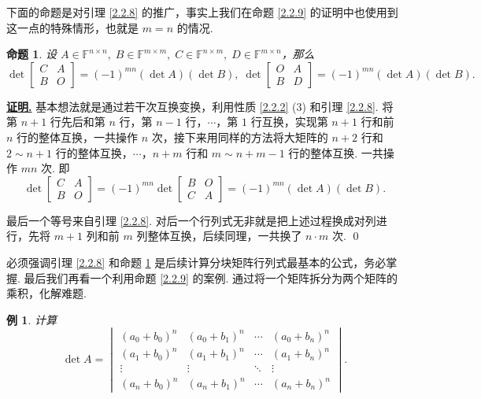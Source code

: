 \documentclass[10pt,openany]{article}
\theoremstyle{thmstyle} %
\theoremstyle{defstyle} %
\theoremstyle{prostyle} %
\newtheorem{proposition}[theorem]{命题}
\theoremstyle{exastyle}
\newtheorem{example}[theorem]{例}
\theoremstyle{remstyle}
\renewenvironment{proof}[1][证明]{\par\underline{\textbf{#1.}} \;\fangsong}{\qed\par}
\newcommand{\F}{\mathbb{F}}
\newcommand{\n}{^{n \times n}}
\newcommand{\mn}{^{m \times n}}
\newcommand{\nm}{^{n \times m}}
\begin{document}
下面的命题是对引理 \ref{2.2.8} 的推广，事实上我们在命题 \ref{2.2.9} 的证明中也使用到这一点的特殊情形，也就是 \( m=n \) 的情况. 

\begin{proposition} \label{2.2.25}
    设 \( A \in \F\n, \; B \in \F^{m \times m}, \; C \in \F\nm, \; D \in \F\mn \)，那么
    \[ 
    \det\begin{bmatrix} 
    	C & A \\
    	 B & O 
    	\end{bmatrix}= (-1)^{mn} (\det A)(\det B), \; 
    \det\begin{bmatrix} 
    	O & A \\
    	 B & D
    \end{bmatrix}= (-1)^{mn} (\det A)(\det B). \]
    
\end{proposition}

\begin{proof}
	基本想法就是通过若干次互换变换，利用性质 \ref{2.2.2} (3) 和引理 \ref{2.2.8}. 将第 \( n+1 \) 行先后和第 \( n \) 行，第 \( n-1 \) 行，\( \cdots \)，第 \( 1 \) 行互换，实现第 \( n+1 \) 行和前 \( n \) 行的整体互换，一共操作 \( n \) 次，接下来用同样的方法将大矩阵的 \( n+2 \) 行和 \( 2 \sim n+1 \) 行的整体互换，\( \cdots \)，\( n+m \) 行和 \( m \sim n+m-1 \) 行的整体互换. 一共操作 \( mn \) 次. 即
	\[ \det\begin{bmatrix} 
		C & A \\
		B & O 
	\end{bmatrix}= (-1)^{mn}\det\begin{bmatrix} 
	B & O \\
	C & A 
	\end{bmatrix}= (-1)^{mn} (\det A)(\det B). \]
	
	最后一个等号来自引理 \ref{2.2.8}. 对后一个行列式无非就是把上述过程换成对列进行，先将 \( m+1 \) 列和前 \( m \) 列整体互换，后续同理，一共换了 \( n \cdot m \) 次.
\end{proof}

必须强调引理 \ref{2.2.8} 和命题 \ref{2.2.25} 是后续计算分块矩阵行列式最基本的公式，务必掌握. 最后我们再看一个利用命题 \ref{2.2.9} 的案例. 通过将一个矩阵拆分为两个矩阵的乘积，化解难题.

\begin{example}
	计算
	\[ \det A = \begin{vmatrix}
		(a_0 + b_0)^n & (a_0 + b_1)^n & \cdots & (a_0 + b_n)^n \\
		(a_1 + b_0)^n & (a_1 + b_1)^n & \cdots & (a_1 + b_n)^n \\
		\vdots & \vdots & \ddots & \vdots \\
		(a_n + b_0)^n & (a_n + b_1)^n & \cdots & (a_n + b_n)^n
	\end{vmatrix}. \]
\end{example}
\end{document}
